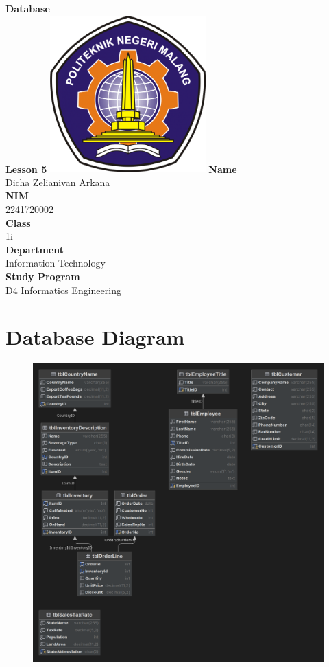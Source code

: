 \documentclass[12pt,titlepage]{article}
\newcommand{\vSubject}{Database}
\newcommand{\vSubtitle}{Lesson 5}
\newcommand{\vName}{Dicha Zelianivan Arkana}
\newcommand{\vNIM}{2241720002}
\newcommand{\vClass}{1i}
\newcommand{\vDepartment}{Information Technology}
\newcommand{\vStudyProgram}{D4 Informatics Engineering}
\begin{document}
\begin{titlepage}
    \centering
    \vfill
    {\bfseries\LARGE
        \vSubject\\
        \vskip0.25cm
        \vSubtitle
    }
    \vfill
    \includegraphics[width=6cm]{images/polinema-logo.png}
    \vfill
    {
        \textbf{Name}\\
        \vName\\
        \vskip0.5cm
        \textbf{NIM}\\
        \vNIM\\
        \vskip0.5cm
        \textbf{Class}\\
        \vClass\\
        \vskip0.5cm
        \textbf{Department}\\
        \vDepartment\\
        \vskip0.5cm
        \textbf{Study Program}\\
        \vStudyProgram
    }
\end{titlepage}

\section{Database Diagram}
\begin{figure}[h]
    \centering
    \includegraphics[width=\textwidth]{./images/diagram.png}
\end{figure}
\end{document}
